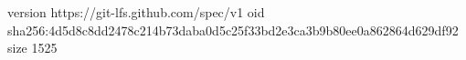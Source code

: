 version https://git-lfs.github.com/spec/v1
oid sha256:4d5d8c8dd2478c214b73daba0d5c25f33bd2e3ca3b9b80ee0a862864d629df92
size 1525
